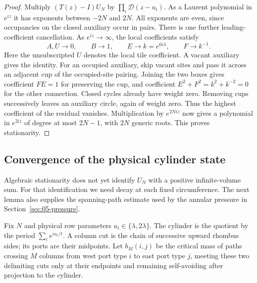 \begin{proof}
Multiply $(T(z)-I)U_N$ by $\prod_i\mathscr D(z-u_i)$. As a Laurent polynomial
in $e^{iz}$ it has exponents between $-2N$ and $2N$. All exponents
are even, since occupancies on the closed auxiliary occur in pairs.
There is one further leading-coefficient cancellation. As
$e^{iz}\to\infty$, the local coefficients satisfy
\[
 A,U\longrightarrow0,\qquad B\longrightarrow1,\qquad
 E\longrightarrow k=e^{6i\lambda},\qquad F\longrightarrow k^{-1}.
\]
Here the unsubscripted $U$ denotes the local tile coefficient. A
vacant auxiliary gives the identity. For an occupied auxiliary, skip
vacant sites and pass it across an adjacent cup of the occupied-site
pairing. Joining the two boxes gives coefficient $FE=1$ for preserving
the cup, and coefficient $E^2+F^2=k^2+k^{-2}=0$ for the other
connection. Closed cycles already have weight zero. Removing cups
successively leaves an auxiliary circle, again of weight zero.
Thus the highest coefficient of the residual vanishes. Multiplication
by $e^{2Niz}$ now gives a polynomial in $e^{2iz}$ of degree at most
$2N-1$, with $2N$ generic roots. This proves stationarity.

\end{proof}

\subsection{Convergence of the physical cylinder state}

Algebraic stationarity does not yet identify $U_N$ with a positive
infinite-volume sum. For that identification we need decay at each
fixed circumference. The next lemma also supplies the spanning-path
estimate used by the annular pressure in Section~\ref{sec:05-pressure}.

Fix $N$ and physical row parameters $u_i\in\{\lambda,2\lambda\}$.
The cylinder is the quotient by the period
$\sum_i e^{iu_i/t}$. A column cut is the chain of successive upward
rhombus sides; its ports are their midpoints. Let $b_M(i,j)$ be the
critical mass of paths crossing $M$ columns from west port type $i$
to east port type $j$, meeting these two delimiting cuts only at their
endpoints and remaining self-avoiding after projection to the cylinder.

